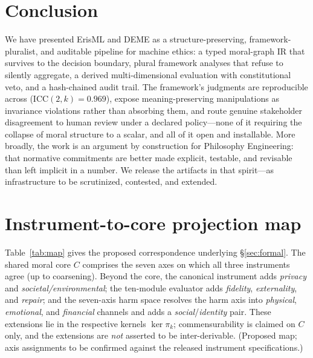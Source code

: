 \section{Conclusion}
\label{sec:conc}
We have presented ErisML and DEME as a structure-preserving, framework-pluralist, and auditable
pipeline for machine ethics: a typed moral-graph IR that survives to the decision boundary,
plural framework analyses that refuse to silently aggregate, a derived multi-dimensional
evaluation with constitutional veto, and a hash-chained audit trail. The framework's judgments
are reproducible across  (ICC$(2,k)=0.969$), expose meaning-preserving manipulations as
invariance violations rather than absorbing them, and route genuine stakeholder disagreement to
human review under a declared policy---none of it requiring the collapse of moral structure to a
scalar, and all of it open and installable. More broadly, the work is an argument by
construction for Philosophy Engineering: that normative commitments are better made explicit,
testable, and revisable than left implicit in a number. We release the artifacts in that
spirit---as infrastructure to be scrutinized, contested, and extended.

\appendix
\section{Instrument-to-core projection map}
\label{app:map}
Table~\ref{tab:map} gives the proposed correspondence underlying \S\ref{sec:formal}. The
shared moral core $C$ comprises the seven axes on which all three instruments agree (up to
coarsening). Beyond the core, the canonical instrument adds \emph{privacy} and
\emph{societal/environmental}; the ten-module evaluator adds \emph{fidelity},
\emph{externality}, and \emph{repair}; and the seven-axis harm space resolves the harm axis
into \emph{physical}, \emph{emotional}, and \emph{financial} channels and adds a
\emph{social}/\emph{identity} pair. These extensions lie in the respective kernels
$\ker\pi_k$; commensurability is claimed on $C$ only, and the extensions are \emph{not}
asserted to be inter-derivable. (Proposed map; axis assignments to be confirmed against the
released instrument specifications.)

